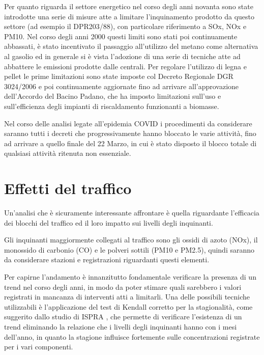 \documentclass{article}
\begin{document}
Per quanto riguarda il settore energetico nel corso degli anni novanta sono state introdotte una serie di misure atte a limitare l'inquinamento prodotto da questo settore (ad esempio il DPR203/88), con particolare riferimento a SOx, NOx e PM10. Nel corso degli anni 2000 questi limiti sono stati poi continuamente abbassati, è stato incentivato il passaggio all'utilizzo del metano come alternativa al gasolio ed in generale si è vista l'adozione di una serie di tecniche atte ad abbattere le emissioni prodotte dalle centrali. 
Per regolare l'utilizzo di legna e pellet le prime limitazioni sono state imposte col Decreto Regionale DGR 3024/2006 e poi continuamente aggiornate fino ad arrivare all'approvazione dell'Accordo del Bacino Padano, che ha imposto limitazioni sull'uso e sull'efficienza degli impianti di riscaldamento funzionanti a biomasse.

Nel corso delle analisi legate all'epidemia COVID i procedimenti da considerare saranno tutti i decreti che progressivamente hanno bloccato le varie attività, fino ad arrivare a quello finale del 22 Marzo, in cui è stato disposto il blocco totale di qualsiasi attività ritenuta non essenziale.


\section{Effetti del traffico}
\label{sec:traffico}
Un'analisi che è sicuramente interessante affrontare è quella riguardante l'efficacia dei blocchi del traffico ed il loro impatto sui livelli degli inquinanti. 

Gli inquinanti maggiormente collegati al traffico sono gli ossidi di azoto (NOx), il monossido di carbonio (CO) e le polveri sottili (PM10 e PM2.5), quindi saranno da considerare stazioni e registrazioni riguardanti questi elementi.

Per capirne l'andamento è innanzitutto fondamentale verificare la presenza di un trend nel corso degli anni, in modo da poter stimare quali sarebbero i valori registrati in mancanza di interventi atti a limitarli. Una delle possibili tecniche utilizzabili è l'applicazione del test di Kendall corretto per la stagionalità, come suggerito dallo studio di ISPRA \cite{cattani2014analisi}, che permette di verificare l'esistenza di un trend eliminando la relazione che i livelli degli inquinanti hanno con i mesi dell'anno, in quanto la stagione influisce fortemente sulle concentrazioni registrate per i vari componenti.   
\end{document}
